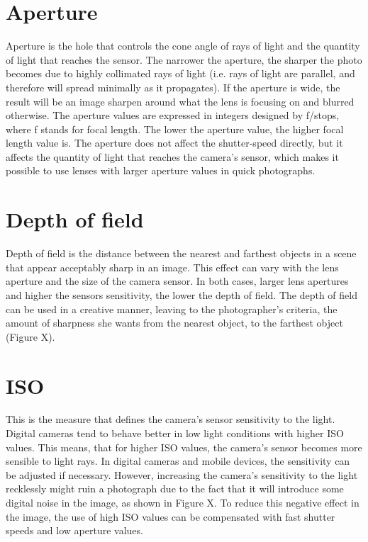 \section{Aperture}

Aperture is the hole that controls the cone angle of rays of light and the quantity of light that reaches the sensor. The narrower the aperture, the sharper the photo becomes due to highly collimated rays of light (i.e. rays of light are parallel, and therefore will spread minimally as it propagates).
If the aperture is wide, the result will be an image sharpen around what the lens is focusing on and blurred otherwise.
The aperture values are expressed in integers designed by f/stops, where f stands for focal length. The lower the aperture value, the higher focal length value is.
The aperture does not affect the shutter-speed directly, but it affects the quantity of light that reaches the camera’s sensor, which makes it possible to use lenses with larger aperture values in quick photographs.

\section{Depth of field}

Depth of field is the distance between the nearest and farthest objects in a scene that appear acceptably sharp in an image. This effect can vary with the lens aperture and the size of the camera sensor. In both cases, larger lens apertures and  higher the sensors sensitivity, the lower the depth of field.
The depth of field can be used in a creative manner, leaving to the  photographer's criteria, the amount of sharpness she wants from the nearest object, to the farthest object (Figure X).

\section{ISO}

This is the measure that defines the camera’s sensor sensitivity to the light. Digital cameras tend to behave better in low light conditions with higher ISO values. This means, that for higher ISO values, the camera’s sensor becomes more sensible to light rays.
In digital cameras and mobile devices, the sensitivity can be adjusted if necessary. However, increasing the camera’s sensitivity to the light recklessly might ruin a photograph due to the fact that it will introduce some digital noise in the image, as shown in Figure X. To reduce this negative effect in the image, the use of high ISO values can be compensated with fast shutter speeds and low aperture values.

